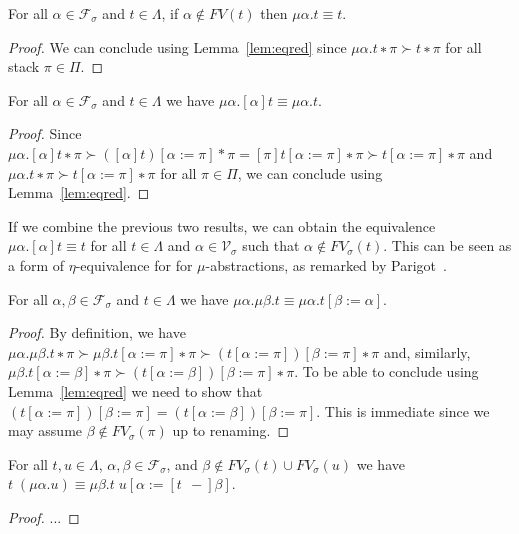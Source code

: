 \begin{theorem}
  For all $α ∈ \mathcal{F}_{σ}$ and $t ∈ Λ$, if $α ∉ FV(t)$ then $μα.t ≡ t$.
\end{theorem}
\begin{proof}
  We can conclude using Lemma~\ref{lem:eqred} since ${μα.t ∗ π} ≻ {t ∗ π}$ for
  all stack $π ∈ Π$.
\end{proof}

\begin{theorem}
  For all $α ∈ \mathcal{F}_σ$ and $t ∈ Λ$ we have $μα.[α]t ≡ μα.t$.
\end{theorem}
\begin{proof}
  Since ${μα.[α]t ∗ π} ≻ {([α]t)[α:=π] * π} = {[π]t[α := π] ∗ π} ≻
  {t[α := π] ∗ π}$ and ${μα.t ∗ π} ≻ {t[α := π] ∗ π}$ for all $π ∈ Π$, we
  can conclude using Lemma~\ref{lem:eqred}.
\end{proof}

\begin{remark}
  If we combine the previous two results, we can obtain the equivalence
  $μα.[α]t ≡ t$ for all $t ∈ Λ$ and $α ∈ \mathcal{V}_{σ}$ such that $α ∉
  FV_{σ}(t)$. This can be seen as a form of $η$-equivalence for
  for $μ$-abstractions, as remarked by Parigot~\cite{Parigot1992}.
\end{remark}

\begin{theorem}
  For all $α, β ∈ \mathcal{F}_{σ}$ and $t ∈ Λ$ we have $μα.μβ.t ≡ μα.t[β := α]$.
\end{theorem}
\begin{proof}
  By definition, we have ${μα.μβ.t ∗ π} ≻ {μβ.t[α := π] ∗ π} ≻
  {(t[α := π])[β := π] ∗ π}$ and, similarly, ${μβ.t[α := β] ∗ π} ≻
  {(t[α := β])[β := π] ∗ π}$. To be able to conclude using
  Lemma~\ref{lem:eqred} we need to show that
  ${(t[α := π])[β := π]} = {(t[α := β])[β := π]}$. This is immediate since
  we may assume $β ∉ FV_{σ}(π)$ up to renaming.
\end{proof}

\begin{theorem}
  For all $t, u ∈ Λ$, $α, β ∈ \mathcal{F}_{σ}$, and $β \notin FV_σ(t) ∪
  FV_σ(u)$ we have $t\;(μα.u) ≡ μβ.t\;u[α := [t\;\,{-}]β]$.
\end{theorem}
\begin{proof}
  ... %
\end{proof}

